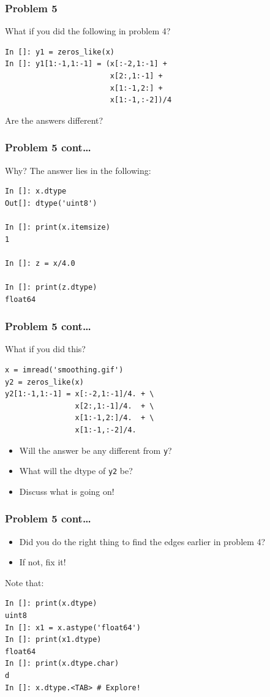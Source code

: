 \documentclass[14pt,compress]{beamer}
\newcommand{\typ}[1]{\lstinline{#1}}
\begin{document}
\begin{frame}[fragile]
  \frametitle{Problem 5}

  What if you did the following in problem 4?
\begin{lstlisting}
In []: y1 = zeros_like(x)
In []: y1[1:-1,1:-1] = (x[:-2,1:-1] +
                        x[2:,1:-1] +
                        x[1:-1,2:] +
                        x[1:-1,:-2])/4
  \end{lstlisting}

    Are the answers different?

\end{frame}

\begin{frame}[fragile]
  \frametitle{Problem 5 cont\ldots}
  Why? The answer lies in the following:
\begin{lstlisting}
In []: x.dtype
Out[]: dtype('uint8')

In []: print(x.itemsize)
1

In []: z = x/4.0

In []: print(z.dtype)
float64

\end{lstlisting}
\end{frame}

\begin{frame}[fragile]
  \frametitle{Problem 5 cont\ldots}
What if you did this?

\begin{lstlisting}
x = imread('smoothing.gif')
y2 = zeros_like(x)
y2[1:-1,1:-1] = x[:-2,1:-1]/4. + \
                x[2:,1:-1]/4.  + \
                x[1:-1,2:]/4.  + \
                x[1:-1,:-2]/4.
\end{lstlisting}
\begin{itemize}
    \item Will the answer be any different from \typ{y}?
    \item What will the dtype of \typ{y2} be?
    \item Discuss what is going on!
\end{itemize}

\end{frame}

\begin{frame}[fragile]
  \frametitle{Problem 5 cont\ldots}
  \begin{itemize}
  \item Did you do the right thing to find the edges earlier in problem 4?
  \item If not, fix it!
  \end{itemize}
  Note that:
  \small
\begin{lstlisting}
In []: print(x.dtype)
uint8
In []: x1 = x.astype('float64')
In []: print(x1.dtype)
float64
In []: print(x.dtype.char)
d
In []: x.dtype.<TAB> # Explore!
\end{lstlisting}
\end{frame}
\end{document}
